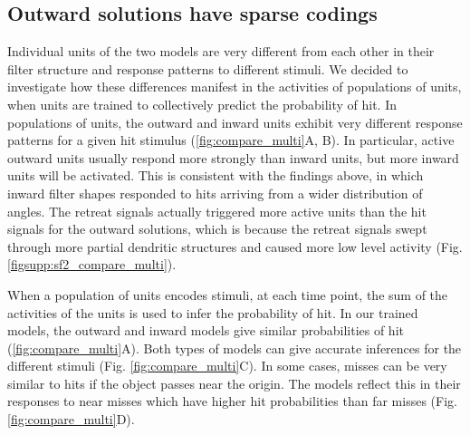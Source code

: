 \documentclass[pdftex,9pt,lineno]{elife}
\begin{document}
\begin{figure}
\label{fig:compare_single}
\end{figure}

\subsection{Outward solutions have sparse codings}

Individual units of the two models are very different from each other in their filter structure and response patterns to different stimuli. We decided to investigate how these differences manifest in the activities of populations of units, when units are trained to collectively predict the probability of hit. In populations of units, the outward and inward units exhibit very different response patterns for a given hit stimulus (\ref{fig:compare_multi}A, B). In particular, active outward units usually respond more strongly than inward units, but more inward units will be activated. This is consistent with the findings above, in which inward filter shapes responded to hits arriving from a wider distribution of angles. The retreat signals actually triggered more active units than the hit signals for the outward solutions, which is because the retreat signals swept through more partial dendritic structures and caused more low level activity (Fig. \ref{figsupp:sf2_compare_multi}).

When a population of units encodes stimuli, at each time point, the sum of the activities of the units is used to infer the probability of hit. In our trained models, the outward and inward models give similar probabilities of hit (\ref{fig:compare_multi}A). Both types of models can give accurate inferences for the different stimuli (Fig. \ref{fig:compare_multi}C). In some cases, misses can be very similar to hits if the object passes near the origin. The models reflect this in their responses to near misses which have higher hit probabilities than far misses (Fig. \ref{fig:compare_multi}D).
\end{document}

